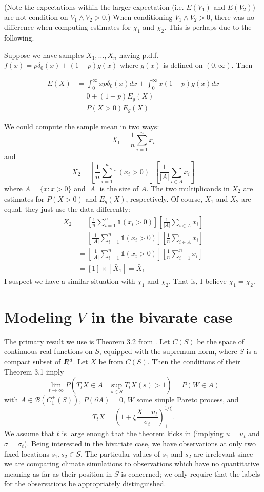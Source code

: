 \documentclass[12pt]{article}
\newcommand{\R}{I\hspace{-4.4pt}R}
\newcommand{\ind}{\mathds{1}}
\begin{document}
(Note the expectations within the larger expectation (i.e. $E(V_1)$ and $E(V_2)$) are not condition on $V_1 \wedge V_2 > 0$.) When conditioning $V_1 \wedge V_2 > 0$, there was no difference when computing estimates for $\chi_1$ and $\chi_2$. This is perhaps due to the following.
\bigskip

Suppose we have samples $X_1,\ldots,X_n$ having p.d.f. $f(x) = p\delta_0(x) + (1-p)g(x)$ where $g(x)$ is defined on $(0, \infty)$. Then

\begin{align*}
E(X) &= \int_0^\infty x p \delta_0(x) dx + \int_0^\infty x (1-p) g(x) dx \\
&= 0 + (1-p)E_g(X) \\
&= P(X > 0)E_g(X) 
\end{align*}

We could compute the sample mean in two ways:
\[ \bar{X}_1 = \frac{1}{n}\sum_{i=1}^n x_i \]
and
\[ \bar{X}_2 = \left[\frac{1}{n}\sum_{i=1}^n \ind(x_i > 0)\right] \left[\frac{1}{|A|}\sum_{i\in A} x_i\right] \]
where $A=\{x : x > 0\}$ and $|A|$ is the size of $A$. The two multiplicands in $\bar{X}_2$ are estimates for $P(X>0)$ and $E_g(X)$, respectively. Of course, $\bar{X}_1$ and $\bar{X}_2$ are equal, they just use the data differently:
\begin{align*}
\bar{X}_2 &= \left[\frac{1}{n}\sum_{i=1}^n \ind(x_i > 0)\right] \left[\frac{1}{|A|}\sum_{i\in A} x_i\right]  \\
&= \left[\frac{1}{|A|}\sum_{i=1}^n \ind(x_i > 0)\right] \left[\frac{1}{n}\sum_{i\in A} x_i\right]  \\
&= \left[\frac{1}{|A|}\sum_{i=1}^n \ind(x_i > 0)\right] \left[\frac{1}{n}\sum_{i=1}^n x_i\right]  \\
&= \left[1\right] \times \left[\bar{X}_1\right] = \bar{X}_1
\end{align*}
I suspect we have a similar situation with $\chi_1$ and $\chi_2$. That is, I believe $\chi_1=\chi_2$.
\bigskip

\section*{Modeling $V$ in the bivarate case}

The primary result we use is Theorem 3.2 from \cite{ferreira2014generalized}. Let $C(S)$ be the space of continuous real functions on $S$, equipped with the supremum norm, where $S$ is a compact subset of $\R^d$. Let $X$ be from $C(S)$. Then the conditions of their Theorem 3.1 imply
\[ \lim_{t\rightarrow\infty} P\left(T_t X \in A \middle| \sup_{s\in S} T_t X(s) > 1\right) = P(W \in A) \]
with $A \in \mathcal{B}(C_1^+(S))$, $P(\partial A)=0$, $W$ some simple Pareto process, and
\[ T_t X = \left(1 + \xi \frac{X - u_t}{\sigma_t}\right)_+^{1/\xi}. \]
We assume that $t$ is large enough that the theorem kicks in (implying $u=u_t$ and $\sigma=\sigma_t$). Being interested in the bivariate case, we have observations at only two fixed locations $s_1,s_2\in S$. The particular values of $s_1$ and $s_2$ are irrelevant since we are comparing climate simulations to observations which have no quantitative meaning as far as their position in $S$ is concerned; we only require that the labels for the observations be appropriately distinguished.
\bigskip
\end{document}
